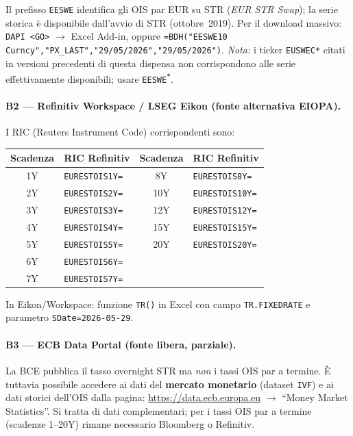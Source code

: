 \documentclass[11pt,a4paper]{article}
\theoremstyle{plain}
\theoremstyle{definition}
\theoremstyle{remark}
\begin{document}
\noindent Il prefisso \texttt{EESWE} identifica gli OIS par EUR su \texteuro{}STR
(\emph{EUR \texteuro{}STR Swap}); la serie storica è disponibile dall'avvio di
\texteuro{}STR (ottobre~2019). Per il download massivo: \texttt{DAPI <GO>} $\to$
Excel Add-in, oppure \texttt{=BDH("EESWE10 Curncy","PX\_LAST","29/05/2026","29/05/2026")}.
\emph{Nota:} i ticker \texttt{EUSWEC*} citati in versioni precedenti di questa dispensa
non corrispondono alle serie effettivamente disponibili; usare \texttt{EESWE\textsuperscript{*}}.

\paragraph{B2 --- Refinitiv Workspace / LSEG Eikon (fonte alternativa EIOPA).}
I RIC (Reuters Instrument Code) corrispondenti sono:

\begin{center}\small
\renewcommand{\arraystretch}{1.2}
\begin{tabular}{clcl}
\toprule
\textbf{Scadenza} & \textbf{RIC Refinitiv} & \textbf{Scadenza} & \textbf{RIC Refinitiv} \\
\midrule
1Y  & \texttt{EURESTOIS1Y=}  & 8Y  & \texttt{EURESTOIS8Y=}  \\
2Y  & \texttt{EURESTOIS2Y=}  & 10Y & \texttt{EURESTOIS10Y=} \\
3Y  & \texttt{EURESTOIS3Y=}  & 12Y & \texttt{EURESTOIS12Y=} \\
4Y  & \texttt{EURESTOIS4Y=}  & 15Y & \texttt{EURESTOIS15Y=} \\
5Y  & \texttt{EURESTOIS5Y=}  & 20Y & \texttt{EURESTOIS20Y=} \\
6Y  & \texttt{EURESTOIS6Y=}  &     &                        \\
7Y  & \texttt{EURESTOIS7Y=}  &     &                        \\
\bottomrule
\end{tabular}
\end{center}

\noindent In Eikon/Workspace: funzione \texttt{TR()} in Excel con campo \texttt{TR.FIXEDRATE}
e parametro \texttt{SDate=2026-05-29}.

\paragraph{B3 --- ECB Data Portal (fonte libera, parziale).}
La BCE pubblica il tasso overnight \texteuro{}STR ma \emph{non} i tassi OIS
par a termine. \`E tuttavia possibile accedere ai dati del \textbf{mercato
monetario} (dataset \texttt{IVF}) e ai dati storici dell'OIS dalla pagina:
\url{https://data.ecb.europa.eu} $\to$ ``Money Market Statistics''.
Si tratta di dati complementari; per i tassi OIS par a termine (scadenze 1--20Y)
rimane necessario Bloomberg o Refinitiv.
\end{document}
